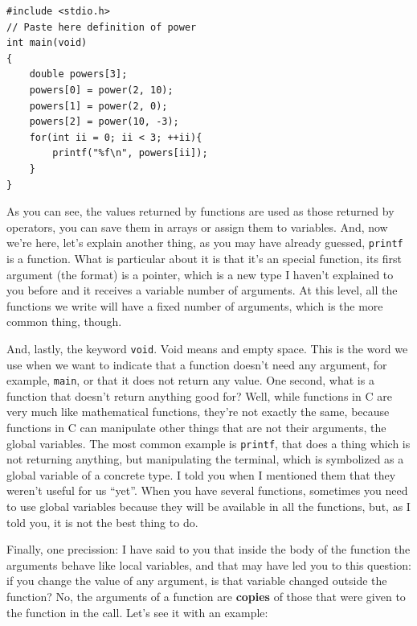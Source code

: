 \documentclass[a4paper]{article}
\begin{document}
\noindent
\begin{minipage}[H]{\linewidth}
\mbox{}
\begin{lstlisting}[style=C, label={lst:functionInvocation},
caption={Function call in C}]
#include <stdio.h>
// Paste here definition of power
int main(void)
{
    double powers[3];
    powers[0] = power(2, 10);
    powers[1] = power(2, 0);
    powers[2] = power(10, -3);
    for(int ii = 0; ii < 3; ++ii){
        printf("%f\n", powers[ii]);
    }
}
\end{lstlisting}
\end{minipage}

As you can see, the values returned by functions are used as those returned by
operators, you can save them in arrays or assign them to variables. And, now
we're here, let's explain another thing, as you may have already guessed,
\verb!printf! is a function. What is particular about it is that it's an special
function, its first argument (the format) is a pointer, which is a new type I
haven't explained to you before and it receives a variable number of arguments.
At this level, all the functions we write will
have a fixed number of arguments, which is the more common thing, though.

And, lastly, the keyword \lstinline[style=C]{void}. Void means and empty space.
This is the word we use when we want to indicate that a function doesn't need
any argument, for example, \verb!main!, or that it does not return any value.
One second, what is a function that doesn't return anything good for? Well,
while functions in C are very much like mathematical functions, they're not
exactly the same, because functions in C can manipulate other things that are
not their arguments, the global variables. The most common example is
\verb!printf!, that does a thing which is not returning anything, but
manipulating the terminal, which is symbolized as a global variable of a concrete
type. I told you when I mentioned them that they weren't useful for us ``yet''.
When you have several functions, sometimes you need to use global variables
because they will be available in all the functions, but, as I told you, it is
not the best thing to do.

Finally, one precission: I have said to you that inside the body of the function
the arguments behave like local variables, and that may have led you to this
question: if you change the value of any argument, is that variable changed
outside the function? No, the arguments of a function are \textbf{copies} of
those that were given to the function in the call.
Let's see it with an example:
\end{document}

